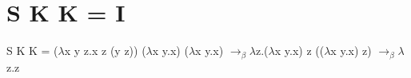 \documentclass{article}
\begin{document}
\section{S K K = I}
{
\Large
S K K = ($\lambda$x y z.x z (y z)) ($\lambda$x y.x) ($\lambda$x y.x) \newline
$\rightarrow_\beta \lambda$z.($\lambda$x y.x) z (($\lambda$x y.x) z) \newline
$\rightarrow_\beta \lambda$z.z
}
\end{document}
